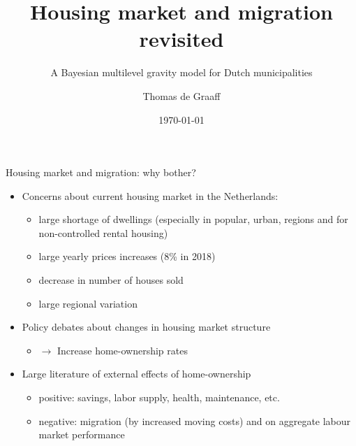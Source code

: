 \documentclass{beamer}
\title{Housing market and migration revisited}
\subtitle{A  Bayesian multilevel gravity model for Dutch municipalities}
\date{\today}
\author{Thomas de Graaff}
\institute{Vrije Universiteit Amsterdam\\Department of Spatial Economics}
\begin{document}
\maketitle

\begin{frame}{Housing market and migration: why bother?}
   	\begin{itemize}
   		\item \alert{Concerns} about current housing market in the Netherlands:
   		\begin{itemize}
   			\item large \alert{shortage} of dwellings (especially in popular, urban, regions and for non-controlled rental housing)
   			\item large yearly prices \alert{increases} (8\% in 2018)
   			\item decrease in number of houses \alert{sold}
   			\item large \alert{regional} variation\newline
   		\end{itemize}
                \item Policy debates about changes in housing market \alert{structure}
                \begin{itemize}
                \item $\longrightarrow$ Increase home-ownership rates\newline
                \end{itemize}
   		\item Large literature of \alert{external} effects of home-ownership \citep{dietz2003social}
   		\begin{itemize}
   			\item \alert{positive}: savings, labor supply, health, maintenance, etc.
   			\item \alert{negative}: migration (by increased moving costs) and on aggregate labour market performance \citep{oswald1996conjecture,oswald1999housing}
   		\end{itemize}
   	\end{itemize}
\end{frame}
\end{document}
